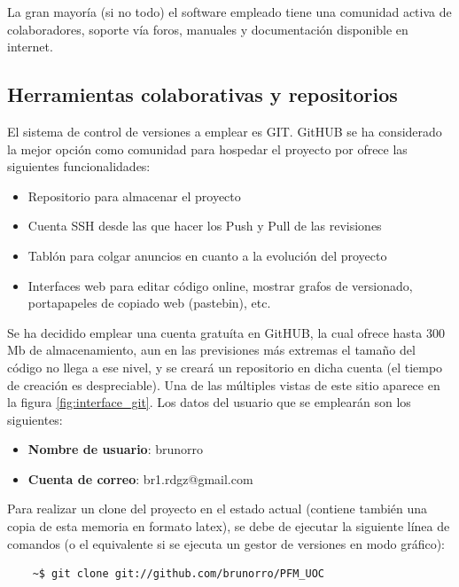 La gran mayoría (si no todo) el software empleado tiene una comunidad activa de colaboradores, soporte vía foros, manuales y documentación disponible en internet. 
	

\subsection{Herramientas colaborativas y repositorios}
El sistema de control de versiones a emplear es GIT. GitHUB se ha considerado la mejor opción como comunidad para hospedar el proyecto por ofrece las siguientes funcionalidades:
\begin{itemize}
	\item{Repositorio para almacenar el proyecto}
	\item{Cuenta SSH desde las que hacer los Push y Pull de las revisiones}
	\item{Tablón para colgar anuncios en cuanto a la evolución del proyecto}
	\item{Interfaces web para editar código online, mostrar grafos de versionado, portapapeles de copiado web (pastebin), etc.}
\end{itemize}
Se ha decidido emplear una cuenta gratuíta en GitHUB, la cual ofrece hasta 300 Mb de almacenamiento, aun en las previsiones más extremas el tamaño del código no llega a ese nivel, y se creará un repositorio en dicha cuenta (el tiempo de creación es despreciable). Una de las múltiples vistas de este sitio aparece en la figura \ref{fig:interface_git}.  Los datos del usuario que se emplearán son los siguientes:
\begin{itemize}
	\item{\textbf{Nombre de usuario}: brunorro}
	\item{\textbf{Cuenta de correo}: br1.rdgz@gmail.com}
\end{itemize}

Para realizar un clone del proyecto en el estado actual (contiene también una copia de esta memoria en formato latex), se debe de ejecutar la siguiente línea de comandos (o el equivalente si se ejecuta un gestor de versiones en modo gráfico):

\begin{verbatim}
	~$ git clone git://github.com/brunorro/PFM_UOC	
\end{verbatim}

